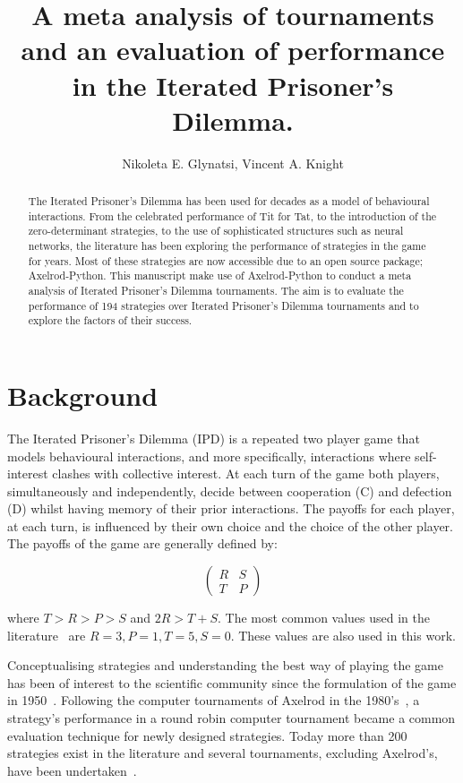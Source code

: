 \documentclass{article}
\title{A meta analysis of tournaments and an evaluation of performance in the
Iterated Prisoner's Dilemma.}
\author{Nikoleta E. Glynatsi, Vincent A. Knight}
\date{}
\newcommand{\numberofalltournaments}{}
\begin{document}
\maketitle

\begin{abstract}

The Iterated Prisoner's Dilemma has been used for decades as a model of
behavioural interactions. From the celebrated performance of Tit for Tat, to the
introduction of the zero-determinant strategies, to the use of sophisticated
structures such as neural networks, the literature has been exploring the
performance of strategies in the game for years. Most of these strategies are
now accessible due to an open source package; Axelrod-Python. This manuscript
make use of Axelrod-Python to conduct a meta analysis of Iterated Prisoner's
Dilemma tournaments. The aim is to evaluate the performance of 194 strategies
over \numberofalltournaments Iterated Prisoner's Dilemma tournaments and to
explore the factors of their success.
\end{abstract}

\section{Background}

The Iterated Prisoner's Dilemma (IPD) is a repeated two player game that models
behavioural interactions, and more specifically, interactions where
self-interest clashes with collective interest. At each turn of the game both
players, simultaneously and independently, decide between cooperation (C) and
defection (D) whilst having memory of their prior interactions. The payoffs for each
player, at each turn, is influenced by their own choice and the choice of the
other player. The payoffs of the game are generally defined by:

\[\begin{pmatrix}
R & S \\
T & P
\end{pmatrix}\]

where \(T > R > P > S\) and \(2R > T + S\). The most common values used in
the literature~\cite{Axelrod1981} are $R=3, P=1, T=5, S=0$. These values are also
used in this work.

Conceptualising strategies and understanding the best way of playing the game
has been of interest to the scientific community since the formulation of the
game in 1950~\cite{Flood1958}. Following the computer tournaments of Axelrod in the
1980's~\cite{Axelrod1980a, Axelrod1980b}, a strategy's performance in a round
robin computer tournament became a common evaluation technique for newly designed
strategies. Today more than 200 strategies exist in the literature and several
tournaments, excluding Axelrod's, have been undertaken~\cite{Bendor1991,
Harper2017, Kendall2007, Stephens2002, Stewart2012}.
\end{document}
